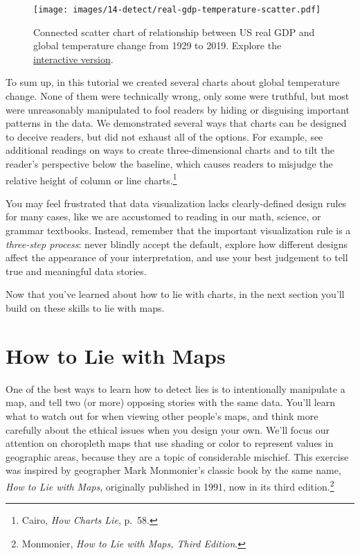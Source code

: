 \documentclass[
  english,
]{book}
\begin{document}
\begin{figure}
\centering
\texttt{[image: images/14-detect/real-gdp-temperature-scatter.pdf]}
\caption{\label{fig:real-gdp-temperature-scatter}Connected scatter chart of relationship between US real GDP and global temperature change from 1929 to 2019. Explore the \href{https://datawrapper.dwcdn.net/Zleaq/}{interactive version}.}
\end{figure}

To sum up, in this tutorial we created several charts about global temperature change. None of them were technically wrong, only some were truthful, but most were unreasonably manipulated to fool readers by hiding or disguising important patterns in the data. We demonstrated several ways that charts can be designed to deceive readers, but did not exhaust all of the options. For example, see additional readings on ways to create three-dimensional charts and to tilt the reader's perspective below the baseline, which causes readers to misjudge the relative height of column or line charts.\footnote{Cairo, \emph{How {Charts Lie}}, p.~58.}

You may feel frustrated that data visualization lacks clearly-defined design rules for many cases, like we are accustomed to reading in our math, science, or grammar textbooks. Instead, remember that the important visualization rule is a \emph{three-step process}: never blindly accept the default, explore how different designs affect the appearance of your interpretation, and use your best judgement to tell true and meaningful data stories.

Now that you've learned about how to lie with charts, in the next section you'll build on these skills to lie with maps.

\hypertarget{how-to-lie-with-maps}{%
\section*{How to Lie with Maps}\label{how-to-lie-with-maps}}

One of the best ways to learn how to detect lies is to intentionally manipulate a map, and tell two (or more) opposing stories with the same data. You'll learn what to watch out for when viewing other people's maps, and think more carefully about the ethical issues when you design your own. We'll focus our attention on choropleth maps that use shading or color to represent values in geographic areas, because they are a topic of considerable mischief. This exercise was inspired by geographer Mark Monmonier's classic book by the same name, \emph{How to Lie with Maps}, originally published in 1991, now in its third edition.\footnote{Monmonier, \emph{How to {Lie} with {Maps}, {Third Edition}}.}
\end{document}

